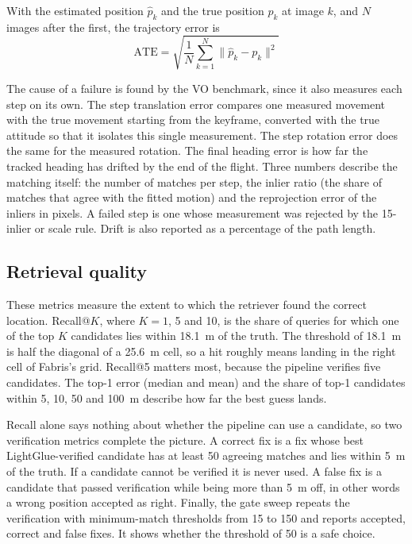 \documentclass[english, Lau, oneside]{sapthesis}%
\begin{document}
With the estimated position $\hat{p}_k$ and the true position $p_k$ at image $k$, and $N$ images after the first, the trajectory error is
\begin{equation}
  \mathrm{ATE} = \sqrt{\frac{1}{N}\sum_{k=1}^{N} \lVert \hat{p}_k - p_k \rVert^2}
  \label{eq:ate}
\end{equation}

The cause of a failure is found by the VO benchmark, since it also measures each step on its own. The step translation error compares one measured movement with the true movement starting from the keyframe, converted with the true attitude so that it isolates this single measurement. The step rotation error does the same for the measured rotation. The final heading error is how far the tracked heading has drifted by the end of the flight. Three numbers describe the matching itself: the number of matches per step, the inlier ratio (the share of matches that agree with the fitted motion) and the reprojection error of the inliers in pixels. A failed step is one whose measurement was rejected by the 15-inlier or scale rule. Drift is also reported as a percentage of the path length.

\subsection{Retrieval quality}
\label{sec:metrics-retrieval}
These metrics measure the extent to which the retriever found the correct location. Recall@$K$, where $K = 1$, 5 and 10, is the share of queries for which one of the top $K$ candidates lies within 18.1~m of the truth. The threshold of 18.1~m is half the diagonal of a 25.6~m cell, so a hit roughly means landing in the right cell of Fabris's grid. Recall@5 matters most, because the pipeline verifies five candidates. The top-1 error (median and mean) and the share of top-1 candidates within 5, 10, 50 and 100~m describe how far the best guess lands.

Recall alone says nothing about whether the pipeline can use a candidate, so two verification metrics complete the picture. A correct fix is a fix whose best LightGlue-verified candidate has at least 50 agreeing matches and lies within 5~m of the truth. If a candidate cannot be verified it is never used. A false fix is a candidate that passed verification while being more than 5~m off, in other words a wrong position accepted as right. Finally, the gate sweep repeats the verification with minimum-match thresholds from 15 to 150 and reports accepted, correct and false fixes. It shows whether the threshold of 50 is a safe choice.
\end{document}
